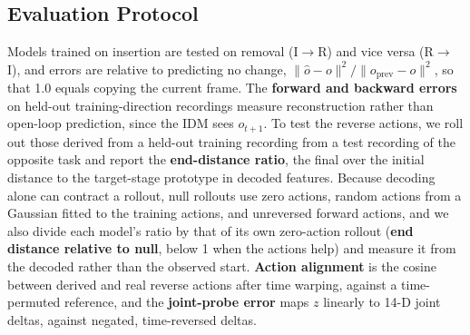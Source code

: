 \documentclass{jcse}
\begin{document}
\subsection{Evaluation Protocol}
Models trained on insertion are tested on removal (I$\to$R) and vice versa (R$\to$I), and errors are relative to predicting no change, $\|\hat o-o\|^2/\|o_{\mathrm{prev}}-o\|^2$, so that 1.0 equals copying the current frame.
The \textbf{forward and backward errors} on held-out training-direction recordings measure reconstruction rather than open-loop prediction, since the IDM sees $o_{t+1}$.
To test the reverse actions, we roll out those derived from a held-out training recording from a test recording of the opposite task and report the \textbf{end-distance ratio}, the final over the initial distance to the target-stage prototype in decoded features.
Because decoding alone can contract a rollout, null rollouts use zero actions, random actions from a Gaussian fitted to the training actions, and unreversed forward actions, and we also divide each model's ratio by that of its own zero-action rollout (\textbf{end distance relative to null}, below 1 when the actions help) and measure it from the decoded rather than the observed start.
\textbf{Action alignment} is the cosine between derived and real reverse actions after time warping, against a time-permuted reference, and the \textbf{joint-probe error} maps $z$ linearly to 14-D joint deltas, against negated, time-reversed deltas.
\end{document}
